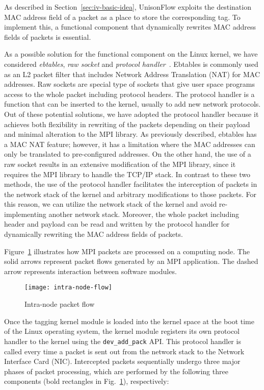 As described in Section~\ref{sec:iv-basic-idea}, UnisonFlow exploits the
destination MAC address field of a packet as a place to store the
corresponding tag. To implement this, a functional component that
dynamically rewrites MAC address fields of packets is essential.

As a possible solution for the functional component on the Linux kernel,
we have considered \emph{ebtables}, \emph{raw socket} and \emph{protocol
handler}~\autocite{Rosen2013}. Ebtables is commonly used as an L2
packet filter that includes Network Address Translation (NAT) for MAC
addresses. Raw sockets are special type of sockets that give user space
programs access to the whole packet including protocol headers. The
protocol handler is a function that can be inserted to the kernel,
usually to add new network protocols. Out of these potential solutions,
we have adopted the protocol handler because it achieves both
flexibility in rewriting of the packets depending on their payload and
minimal alteration to the MPI library. As previously described, ebtables
has a MAC NAT feature; however, it has a limitation where the MAC
addresses can only be translated to pre-configured addresses. On the
other hand, the use of a raw socket results in an extensive modification
of the MPI library, since it requires the MPI library to handle the
TCP/IP stack. In contrast to these two methods, the use of the protocol
handler facilitates the interception of packets in the network stack of
the kernel and arbitrary modifications to those packets. For this
reason, we can utilize the network stack of the kernel and avoid
re-implementing another network stack. Moreover, the whole packet
including header and payload can be read and written by the protocol
handler for dynamically rewriting the MAC address fields of packets.

Figure~\ref{fig:intra-node-flow} illustrates how MPI packets are
processed on a computing node. The solid arrows represent packet flows
generated by an MPI application. The dashed arrow represents interaction
between software modules.

\begin{figure}
    \centering
    \texttt{[image: intra-node-flow]}
    \caption{Intra-node packet flow}%
    \label{fig:intra-node-flow}
\end{figure}

Once the tagging kernel module is loaded into the kernel space at the
boot time of the Linux operating system, the kernel module registers its
own protocol handler to the kernel using the
\lstinline!dev_add_pack! API\@. This protocol handler is
called every time a packet is sent out from the network stack to the
Network Interface Card (NIC). Intercepted packets sequentially undergo
three major phases of packet processing, which are performed by the
following three components (bold rectangles in
Fig.~\ref{fig:intra-node-flow}), respectively:

